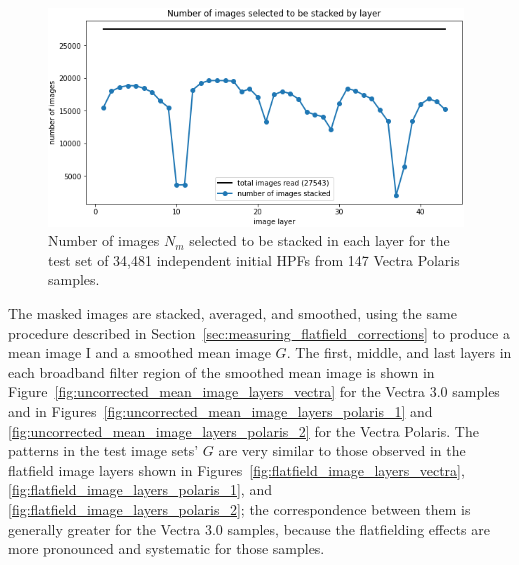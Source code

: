 \documentclass[letterpaper,11pt]{article}
\newcommand{\reffig}[1]{Figure~\ref{#1}}
\newcommand{\refsec}[1]{Section~\ref{#1}}
\newcommand{\Iota}{\mathrm{I}}
\begin{document}
\begin{figure}[!ht]
\centering
\includegraphics[width=0.98\textwidth]{images/results/n_images_stacked_per_layer_test_set_polaris}
\caption{\footnotesize Number of images $N_{m}$ selected to be stacked in each layer for the test set of 34,481 independent initial HPFs from 147 Vectra Polaris samples.}
\label{fig:test_set_n_images_stacked_polaris}
\end{figure} 

The masked images are stacked, averaged, and smoothed, using the same procedure described in \refsec{sec:measuring_flatfield_corrections} to produce a mean image $\Iota$ and a smoothed mean image $G$. The first, middle, and last layers in each broadband filter region of the smoothed mean image is shown in \reffig{fig:uncorrected_mean_image_layers_vectra} for the Vectra 3.0 samples and in Figures~\ref{fig:uncorrected_mean_image_layers_polaris_1} and \ref{fig:uncorrected_mean_image_layers_polaris_2} for the Vectra Polaris. The patterns in the test image sets' $G$ are very similar to those observed in the flatfield image layers shown in Figures~\ref{fig:flatfield_image_layers_vectra}, \ref{fig:flatfield_image_layers_polaris_1}, and \ref{fig:flatfield_image_layers_polaris_2}; the correspondence between them is generally greater for the Vectra 3.0 samples, because the flatfielding effects are more pronounced and systematic for those samples. 
\end{document}
